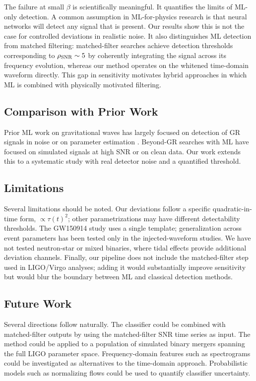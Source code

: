 The failure at small $\beta$ is scientifically meaningful. It
quantifies the limits of ML-only detection. A common assumption in
ML-for-physics research is that neural networks will detect any signal
that is present. Our results show this is not the case for controlled
deviations in realistic noise. It also distinguishes ML detection
from matched filtering: matched-filter searches achieve detection
thresholds corresponding to $\rho_{\rm SNR} \sim 5$ by coherently
integrating the signal across its frequency evolution, whereas our
method operates on the whitened time-domain waveform directly. This
gap in sensitivity motivates hybrid approaches in which ML is
combined with physically motivated filtering.

\subsection{Comparison with Prior Work}

Prior ML work on gravitational waves has largely focused on detection
of GR signals in noise \citep{George2018, Gebhard2019} or on parameter
estimation \citep{Gabbard2020, Dax2021}. Beyond-GR searches with ML
have focused on simulated signals at high SNR or on clean data. Our
work extends this to a systematic study with real detector noise and
a quantified threshold.

\subsection{Limitations}

Several limitations should be noted. Our deviations follow a specific
quadratic-in-time form, $\propto \tau(t)^2$; other parametrizations
may have different detectability thresholds. The GW150914 study uses
a single template; generalization across event parameters has been
tested only in the injected-waveform studies. We have not tested
neutron-star or mixed binaries, where tidal effects provide additional
deviation channels. Finally, our pipeline does not include the
matched-filter step used in LIGO/Virgo analyses; adding it would
substantially improve sensitivity but would blur the boundary between
ML and classical detection methods.

\subsection{Future Work}

Several directions follow naturally. The classifier could be combined
with matched-filter outputs by using the matched-filter SNR time
series as input. The method could be applied to a population of
simulated binary mergers spanning the full LIGO parameter space.
Frequency-domain features such as spectrograms could be investigated
as alternatives to the time-domain approach. Probabilistic models
such as normalizing flows could be used to quantify classifier
uncertainty.
